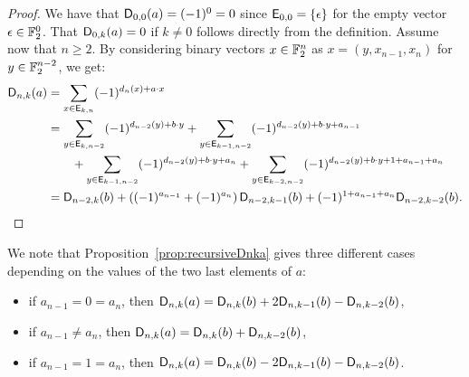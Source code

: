 \documentclass[11pt]{llncs}
\begin{document}
\begin{proof}
    We have that $\mathsf{D}_{0,0}(a)=(-1)^0=0$ since $\mathsf{E}_{0,0}=\{\epsilon\}$ for the empty vector $\epsilon\in\mathbb{F}_2^0$. That $\mathsf{D}_{0,k}(a)=0$ if $k\neq 0$ follows directly from the definition. Assume now that $n\geq 2$. By considering binary vectors $x\in\mathbb{F}_2^n$ as $x=(y,x_{n-1},x_n)$ for $y\in\mathbb{F}_2^{n-2}$, we get:
    \begin{align*}
    \mathsf{D}_{n,k}(a)&=\sum_{x\in \mathsf{E}_{k,n}} (-1)^{d_n(x) +a\cdot x}\\
    &=\sum_{y\in \mathsf{E}_{k,n-2}} (-1)^{d_{n-2}(y) +b\cdot y}+
    \sum_{y\in \mathsf{E}_{k-1,n-2}} (-1)^{d_{n-2}(y) +b\cdot y + a_{n-1}}\\
    &\qquad+\sum_{y\in \mathsf{E}_{k-1,n-2}} (-1)^{d_{n-2}(y) +b\cdot y + a_{n}}
    +\sum_{y\in \mathsf{E}_{k-2,n-2}} (-1)^{d_{n-2}(y) +b\cdot y +1 + a_{n-1}+ a_{n}}\\
    &=\mathsf{D}_{n-2,k}(b)+\left((-1)^{a_{n-1}} + (-1)^{a_{n}}\right)\mathsf{D}_{n-2,k-1}(b) + (-1)^{1+a_{n-1}+a_n} \mathsf{D}_{n-2,k-2}(b).\qedhere
    \end{align*}
\end{proof}







\begin{remark}
    We note that Proposition~\ref{prop:recursiveDnka} gives three different cases depending on the values of the two last elements of $a$:%
\begin{itemize}
	\item if $a_{n-1}=0=a_n$, then $\mathsf{D}_{n,k}(a)=\mathsf{D}_{n,k}(b)+2\mathsf{D}_{n,k-1}(b)-\mathsf{D}_{n,k-2}(b)$,
	\item if $a_{n-1} \ne a_n$, then $\mathsf{D}_{n,k}(a)=\mathsf{D}_{n,k}(b)+\mathsf{D}_{n,k-2}(b)$,
	\item if $a_{n-1}=1=a_n$, then $\mathsf{D}_{n,k}(a)=\mathsf{D}_{n,k}(b)-2\mathsf{D}_{n,k-1}(b)-\mathsf{D}_{n,k-2}(b)$.
\end{itemize}
\end{remark}

\end{document}
